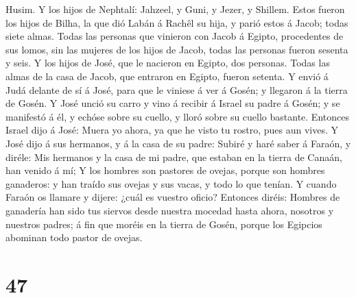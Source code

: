 Husim.  Y los hijos de Nephtalí: Jahzeel, y Guni, y
Jezer, y Shillem.  Estos fueron los hijos de Bilha, la
que dió Labán á Rachêl su hija, y parió estos á Jacob; todas siete
almas.  Todas las personas que vinieron con Jacob á
Egipto, procedentes de sus lomos, sin las mujeres de los hijos de Jacob,
todas las personas fueron sesenta y seis.  Y los hijos de
José, que le nacieron en Egipto, dos personas. Todas las almas de la
casa de Jacob, que entraron en Egipto, fueron setenta.  Y
envió á Judá delante de sí á José, para que le viniese á ver á Gosén; y
llegaron á la tierra de Gosén.  Y José unció su carro y
vino á recibir á Israel su padre á Gosén; y se manifestó á él, y echóse
sobre su cuello, y lloró sobre su cuello bastante. 
Entonces Israel dijo á José: Muera yo ahora, ya que he visto tu rostro,
pues aun vives.  Y José dijo á sus hermanos, y á la casa
de su padre: Subiré y haré saber á Faraón, y diréle: Mis hermanos y la
casa de mi padre, que estaban en la tierra de Canaán, han venido á mí;
 Y los hombres son pastores de ovejas, porque son hombres
ganaderos: y han traído sus ovejas y sus vacas, y todo lo que tenían.
 Y cuando Faraón os llamare y dijere: ¿cuál es vuestro
oficio?  Entonces diréis: Hombres de ganadería han sido
tus siervos desde nuestra mocedad hasta ahora, nosotros y nuestros
padres; á fin que moréis en la tierra de Gosén, porque los Egipcios
abominan todo pastor de ovejas.

\hypertarget{section-46}{%
\section{47}\label{section-46}}

